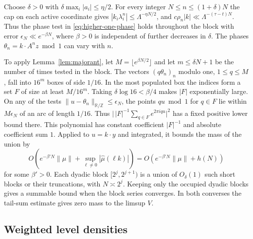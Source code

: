 \documentclass[11pt,a4paper,reqno]{amsart}
\theoremstyle{definition}
\theoremstyle{remark}
\numberwithin{equation}{section}
\begin{document}
Choose \(\delta>0\) with \(\delta\max_i |a_i|\le\eta/2\). For every integer \(N\le n\le(1+\delta)N\) the cap on each active coordinate gives \(|k_i\lambda_i^n|\le\Lambda^{-\eta N/2}\), and \(c\rho_n|k|\ll\Lambda^{-(\tau-t)N}\). Thus the phase test in \eqref{eq:higher-one-phase} holds throughout the block with error \(\epsilon_N\ll e^{-\beta N}\), where \(\beta>0\) is independent of further decreases in \(\delta\). The phases \(\theta_n=k\cdot A^nz\bmod 1\) can vary with \(n\).

To apply Lemma~\ref{lem:majorant}, let \(M=\lfloor e^{\beta N/2}\rfloor\) and let \(m\le\delta N+1\) be the number of times tested in the block. The vectors \((q\theta_n)_n\) modulo one, \(1\le q\le M\), fall into \(16^m\) boxes of side \(1/16\). In the most populated box the indices form a set \(F\) of size at least \(M/16^m\). Taking \(\delta\log16<\beta/4\) makes \(|F|\) exponentially large. On any of the tests \(\|u-\theta_n\|_{\mathbb R/\mathbb Z}\le\epsilon_N\), the points \(qu\bmod1\) for \(q\in F\) lie within \(M\epsilon_N\) of an arc of length \(1/16\). Thus \(\big|\,|F|^{-1}\sum_{q\in F}e^{2\pi iqu}\big|^2\) has a fixed positive lower bound there. This polynomial has constant coefficient \(|F|^{-1}\) and absolute coefficient sum \(1\). Applied to \(u=k\cdot y\) and integrated, it bounds the mass of the union by
\[
 O\!\left(e^{-\beta' N}\|\mu\|+
             \sup_{\ell\ne0}|\widehat\mu(\ell k)|\right)
 =O\!\left(e^{-\beta' N}\|\mu\|+h(N)\right)
\]
for some \(\beta'>0\). Each dyadic block \([2^j,2^{j+1})\) is a union of \(O_\delta(1)\) such short blocks or their truncations, with \(N\asymp2^j\). Keeping only the occupied dyadic blocks gives a summable bound when the block series converges. In both converses the tail-sum estimate gives zero mass to the limsup \(V\).

\subsection{Weighted level densities}
\end{document}
